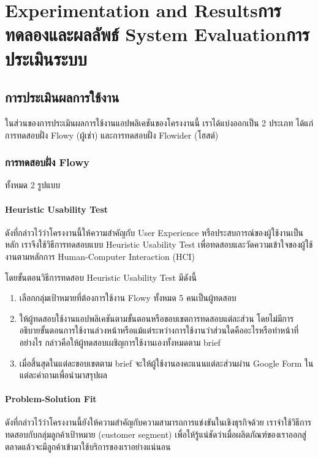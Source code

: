 \chapter{\ifproject%
\ifenglish Experimentation and Results\else การทดลองและผลลัพธ์\fi
\else%
\ifenglish System Evaluation\else การประเมินระบบ\fi
\fi}

\section{การประเมินผลการใช้งาน}
ในส่วนของการประเมินผลการใช้งานแอปพลิเคชันของโครงงานนี้ เราได้แบ่งออกเป็น 2 ประเภท ได้แก่ การทดสอบฝั่ง Flowy (ผู้เช่า) และการทดสอบฝั่ง Flowider (โฮสต์)

\subsection{การทดสอบฝั่ง Flowy}
ทั้งหมด 2 รูปแบบ
\subsubsection{Heuristic Usability Test}
ดังที่กล่าวไว้ว่าโครงงานนี้ให้ความสำคัญกับ User Experience หรือประสบการณ์ของผู้ใช้งานเป็นหลัก เราจึงใช้วิธีการทดสอบแบบ Heuristic Usability Test เพื่อทดสอบและวัดความเข้าใจของผู้ใช้งานตามหลักการ Human-Computer Interaction (HCI)

โดยขั้นตอนวิธีการทดสอบ Heuristic Usability Test มีดังนี้
\begin{enumerate}
    \item เลือกกลุ่มเป้าหมายที่ต้องการใช้งาน Flowy ทั้งหมด 5 คนเป็นผู้ทดสอบ
    \item ให้ผู้ทดสอบใช้งานแอปพลิเคชันตามขั้นตอนหรือขอบเขตการทดสอบแต่ละส่วน โดยไม่มีการอธิบายขั้นตอนการใช้งานล่วงหน้าหรือแม้แต่ระหว่างการใช้งานว่าส่วนใดคืออะไรหรือทำหน้าที่อย่างไร กล่าวคือให้ผู้ทดสอบเผชิญการใช้งานเองทั้งหมดตาม brief
    \item เมื่อสิ้นสุดในแต่ละขอบเขตตาม brief จะให้ผู้ใช้งานลงคะแนนแต่ละส่วนผ่าน Google Form ในแต่ละคำถามเพื่อนำมาสรุปผล
\end{enumerate}
\subsubsection{Problem-Solution Fit}
ดังที่กล่าวไว้ว่าโครงงานนี้ยังให้ความสำคัญกับความสามารถการแข่งขันในเชิงธุรกิจด้วย เราจำใช้วิธีการทดสอบกับกลุ่มลูกค้าเป้าหมาย (customer segment) เพื่อให้รู้แน่ชัดว่าเมื่อผลิตภัณฑ์ของเราออกสู่ตลาดแล้วจะมีลูกค้าเข้ามาใช้บริการของเราอย่างแน่นอน

